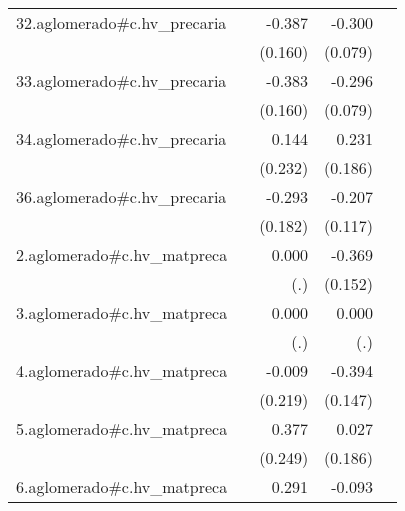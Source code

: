 {\begin{longtable}{l*{4}{D{.}{.}{-1}}}
\addlinespace
32.aglomerado#c.hv\_precaria&                     &      -0.387\sym{*}  &      -0.300\sym{***}&                     \\
            &                     &     (0.160)         &     (0.079)         &                     \\
\addlinespace
33.aglomerado#c.hv\_precaria&                     &      -0.383\sym{*}  &      -0.296\sym{***}&                     \\
            &                     &     (0.160)         &     (0.079)         &                     \\
\addlinespace
34.aglomerado#c.hv\_precaria&                     &       0.144         &       0.231         &                     \\
            &                     &     (0.232)         &     (0.186)         &                     \\
\addlinespace
36.aglomerado#c.hv\_precaria&                     &      -0.293         &      -0.207         &                     \\
            &                     &     (0.182)         &     (0.117)         &                     \\
\addlinespace
2.aglomerado#c.hv\_matpreca&                     &       0.000         &      -0.369\sym{*}  &                     \\
            &                     &         (.)         &     (0.152)         &                     \\
\addlinespace
3.aglomerado#c.hv\_matpreca&                     &       0.000         &       0.000         &                     \\
            &                     &         (.)         &         (.)         &                     \\
\addlinespace
4.aglomerado#c.hv\_matpreca&                     &      -0.009         &      -0.394\sym{**} &                     \\
            &                     &     (0.219)         &     (0.147)         &                     \\
\addlinespace
5.aglomerado#c.hv\_matpreca&                     &       0.377         &       0.027         &                     \\
            &                     &     (0.249)         &     (0.186)         &                     \\
\addlinespace
6.aglomerado#c.hv\_matpreca&                     &       0.291         &      -0.093         &                     \\

\end{longtable}}
